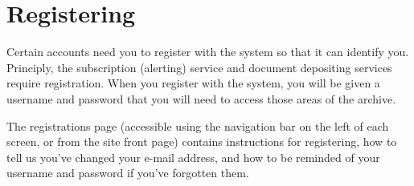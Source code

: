 \section{Registering}


Certain accounts need you to register with the system so that it can identify you. Principly, the subscription (alerting) service and document depositing services require registration. When you register with the system, you will be given a username and password that you will need to access those areas of the archive.

The registrations page (accessible using the navigation bar on the left of each screen, or from the site front page) contains instructions for registering, how to tell us you've changed your e-mail address, and how to be reminded of your username and password if you've forgotten them.
